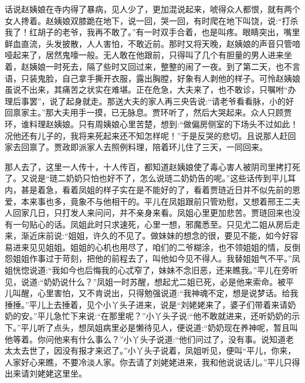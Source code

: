 


\begin{parag}
    话说赵姨娘在寺内得了暴病，见人少了，更加混说起来，唬得众人都恨，就有两个女人搀着。赵姨娘双膝跪在地下，说一回，哭一回，有时爬在地下叫饶，说:“打杀我了！红胡子的老爷，我再不敢了。”有一时双手合着，也是叫疼。眼睛突出，嘴里鲜血直流，头发披散，人人害怕，不敢近前。那时又将天晚，赵姨娘的声音只管喑哑起来了，居然鬼嚎一般。无人敢在他跟前，只得叫了几个有胆量的男人进来坐着，赵姨娘一时死去，隔了些时又回过来，整整的闹了一夜。到了第二天，也不言语，只装鬼脸，自己拿手撕开衣服，露出胸膛，好象有人剥他的样子。可怜赵姨娘虽说不出来，其痛苦之状实在难堪。正在危急，大夫来了，也不敢诊，只嘱咐“办理后事罢”，说了起身就走。那送大夫的家人再三央告说:“请老爷看看脉，小的好回禀家主。”那大夫用手一摸，已无脉息。贾环听了，然后大哭起来。众人只顾贾环，谁料理赵姨娘。只有周姨娘心里苦楚，想到:“做偏房侧室的下场头不过如此！况他还有儿子的，我将来死起来还不知怎样呢！”于是反哭的悲切。且说那人赶回家去回禀了。贾政即派家人去照例料理，陪着环儿住了三天，一同回来。
\end{parag}


\begin{parag}
    那人去了，这里一人传十，十人传百，都知道赵姨娘使了毒心害人被阴司里拷打死了。又说是“琏二奶奶只怕也好不了，怎么说琏二奶奶告的呢。”这些话传到平儿耳内，甚是着急，看着凤姐的样子实在是不能好的了，看着贾琏近日并不似先前的恩爱，本来事也多，竟象不与他相干的。平儿在凤姐跟前只管劝慰，又想着邢王二夫人回家几日，只打发人来问问，并不亲身来看。凤姐心里更加悲苦。贾琏回来也没有一句贴心的话。凤姐此时只求速死，心里一想，邪魔悉至。只见尤二姐从房后走来，渐近床前说:“姐姐，许久的不见了。做妹妹的想念的很，要见不能，如今好容易进来见见姐姐。姐姐的心机也用尽了，咱们的二爷糊涂，也不领姐姐的情，反倒怨姐姐作事过于苛刻，把他的前程去了，叫他如今见不得人。我替姐姐气不平。”凤姐恍惚说道:“我如今也后悔我的心忒窄了，妹妹不念旧恶，还来瞧我。”平儿在旁听见，说道:“奶奶说什么？”凤姐一时苏醒，想起尤二姐已死，必是他来索命。被平儿叫醒，心里害怕，又不肯说出，只得勉强说道:“我神魂不定，想是说梦话。给我捶捶。”平儿上去捶着，见个小丫头子进来，说是“刘姥姥来了，婆子们带着来请奶奶的安。”平儿急忙下来说:“在那里呢？”小丫头子说:“他不敢就进来，还听奶奶的示下。”平儿听了点头，想凤姐病里必是懒待见人，便说道:“奶奶现在养神呢，暂且叫他等着。你问他来有什么事么？”小丫头子说道:“他们问过了，没有事。说知道老太太去世了，因没有报才来迟了。”小丫头子说着，凤姐听见，便叫“平儿，你来，人家好心来瞧，不要冷淡人家。你去请了刘姥姥进来，我和他说说话儿。”平儿只得出来请刘姥姥这里坐。
\end{parag}


